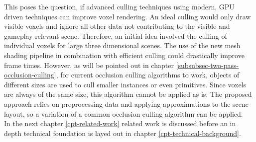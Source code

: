 \noindent
This poses the question, if advanced culling techniques using modern, \ac{GPU} driven techniques can 
improve voxel rendering. An ideal culling would only draw visible voxels and ignore all other data 
not contributing to the visible and gameplay relevant scene. Therefore, an initial idea involved 
the culling of individual voxels for large three dimensional scenes. The use of the new mesh shading 
pipeline in combination with efficient culling could drastically improve frame times. However, as will be 
pointed out in chapter \ref{subsubsec-two-pass-occlusion-culling}, for current occlusion culling 
algorithms to work, objects of different sizes are used to cull smaller instances or even primitives.
Since voxels are always of the same size, this algorithm cannot be applied as is. The proposed approach 
relies on preprocessing data and applying approximations to the scene layout, so a variation of a 
common occlusion culling algorithm can be applied. \\

In the next chapter \ref{cpt-related-work} related work is discussed before an in depth technical foundation 
is layed out in chapter \ref{cpt-technical-background}. 
